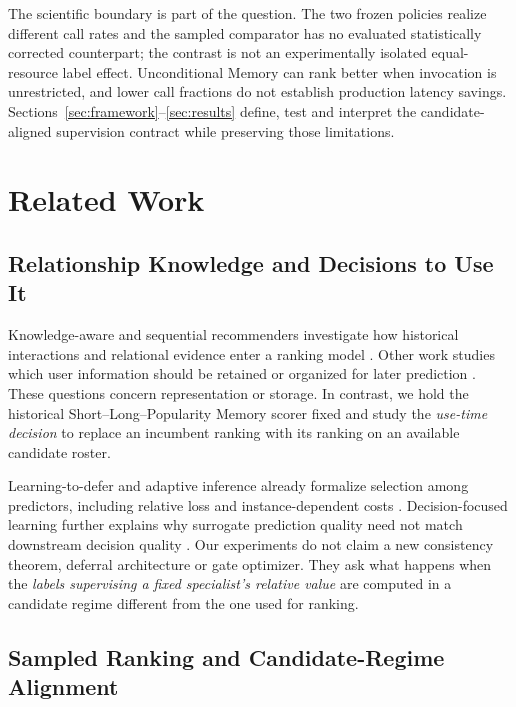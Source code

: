 \documentclass[preprint,12pt]{elsarticle}
\begin{document}
The scientific boundary is part of the question. The two frozen policies realize different call rates and the sampled comparator has no evaluated statistically corrected counterpart; the contrast is not an experimentally isolated equal-resource label effect. Unconditional Memory can rank better when invocation is unrestricted, and lower call fractions do not establish production latency savings. Sections~\ref{sec:framework}--\ref{sec:results} define, test and interpret the candidate-aligned supervision contract while preserving those limitations.

\section{Related Work}

\subsection{Relationship Knowledge and Decisions to Use It}

Knowledge-aware and sequential recommenders investigate how historical interactions and relational evidence enter a ranking model \cite{kang2018sasrec,chen2024cklf,xie2026mhgfcl,kim2026kaper}. Other work studies which user information should be retained or organized for later prediction \cite{zhong2026samd,chen2026memrec}. These questions concern representation or storage. In contrast, we hold the historical Short--Long--Popularity Memory scorer fixed and study the \emph{use-time decision} to replace an incumbent ranking with its ranking on an available candidate roster.

Learning-to-defer and adaptive inference already formalize selection among predictors, including relative loss and instance-dependent costs \cite{mozannar2020defer,narasimhan2022posthoc,mao2024regression,yuan2026dsframe}. Decision-focused learning further explains why surrogate prediction quality need not match downstream decision quality \cite{mandi2024decisionfocused}. Our experiments do not claim a new consistency theorem, deferral architecture or gate optimizer. They ask what happens when the \emph{labels supervising a fixed specialist's relative value} are computed in a candidate regime different from the one used for ranking.

\subsection{Sampled Ranking and Candidate-Regime Alignment}
\end{document}
